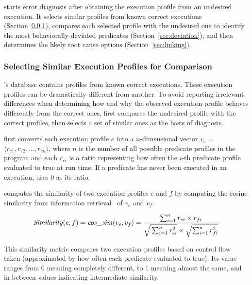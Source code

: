 \ourtool starts error diagnosis after obtaining the execution profile from
an undesired execution. It selects similar
profiles from known correct executions (Section~\ref{sec:similar}), compares
each selected profile with
the undesired one to identify the most behaviorally-deviated predicates
(Section~\ref{sec:deviation}), and then determines
the likely root cause options (Section~\ref{sec:linking}).


\subsubsection{Selecting Similar Execution Profiles for Comparison}
\label{sec:similar}
\ourtool's database contains
profiles from known correct executions.  These execution profiles 
can be dramatically different from another.  To avoid reporting irrelevant
differences when 
determining how and why the observed execution profile behaves
differently from the correct ones, \ourtool first
compares the undesired profile with the
correct profiles, then selects a set of similar ones
as the basis of diagnosis.

\ourtool first converts each execution profile $e$
into a $n$-dimensional
vector $v_e$ =$\langle r_{e1}, r_{e2}, ..., r_{en}\rangle$, where $n$
is the number of all possible predicate profiles in the program
and each $r_{ei}$ is a ratio representing how often the $i$-th predicate
profile evaluated to true at run time.
If a predicate has never been executed in an execution,
\ourtool uses 0 as its ratio. 

\ourtool computes the similarity of two execution profiles $e$ and $f$
by computing the cosine similarity from information retrieval~\cite{Witten96managinggigabytes}
of $v_{e}$ and $v_{f}$.

\vspace{-3mm}

{\small{
\[
\|Similarity|(e, f) = \|cos\_sim|(v_{e}, v_{f}) = \frac{\sum_{i = 1}^{n}r_{ei} \times r_{fi}}
{\sqrt{\strut \sum_{i = 1}^{n}r_{ei}^2} \times \sqrt{\sum_{i = 1}^{n}r_{fi}^2}}
\]
}}

\vspace{-3mm}

This similarity metric compares two execution profiles based on
 control flow taken (approximated by how often each predicate evaluated to
true). Its value ranges from 0 meaning completely different, to 1 meaning
 almost the same, 
and in-between values indicating intermediate similarity.


